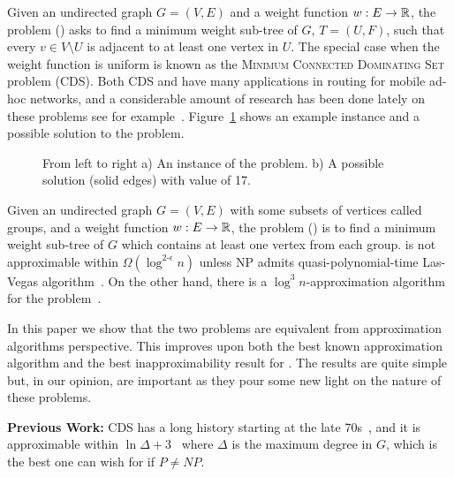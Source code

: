 Given an undirected graph $G = (V, E)$ and a weight function $w:E \to \mathbb{R}$, 
the \Problem{} problem (\Prob{}) asks to find a minimum weight sub-tree of $G$, 
$T = (U, F)$, such that every $v \in V \setminus U$ is adjacent to at least one 
vertex in $U$.
The special case when the weight function is uniform is known as the 
\textsc{Minimum Connected Dominating Set} problem (CDS). 
Both CDS and \Prob{} have many applications in routing
for mobile ad-hoc networks, 
and a considerable amount of research has been done lately on these problems
see for example~\cite{%
shin2010approximation%
,cheng2003polynomial%
,das1997routing%
,adasme2016models%
,adasme2017minimum%
,rossi2018properties%
,adasme2018improved%
,alvarez2018exact%
,dravzic2017metaheuristic%
,shi2011dominating%
}.
Figure~\ref{fig:problem} shows an example instance and a possible solution to the problem. 

\begin{figure}
\begin{center}
\scalebox{.8}{

}
\end{center}
\caption{\label{fig:problem}
From left to right
a) An instance of the \Problem{} problem.
b) A possible solution (solid edges) with value of 17.
}
\end{figure}

Given an undirected graph $G = (V, E)$ with some subsets of vertices called groups,
and a weight function $w:E \to \mathbb{R}$,
the \ProblemGroup{} problem (\ProbGroup{}) is to find a minimum weight sub-tree
of $G$ which contains at least one vertex from each group.
\ProbGroup{} is not approximable within $ \Omega(\log^{2\textbf{-}\epsilon}n)$
unless NP admits quasi-polynomial-time Las-Vegas
algorithm~\cite{halperin2003polylogarithmic}.
On the other hand, there is a $\log^3 n$-approximation algorithm for the 
problem~\cite{garg2000polylogarithmic}.

In this paper we show that the two problems are equivalent 
from approximation algorithms perspective.
This improves upon both the best known approximation algorithm and the best 
inapproximability result for \Prob{}.
The results are quite simple but, in our opinion, 
are important as they pour some new light on the nature of these problems.
 
\textbf{Previous Work:}
CDS has a long history starting at the late 70s~\cite{sampathkumar1979connected},
and it is approximable within $\ln\Delta + 3$~\cite{guha1998approximation} 
where $\Delta$ is the maximum degree in $G$,
which is the best one can wish for if $P \neq NP$. 

